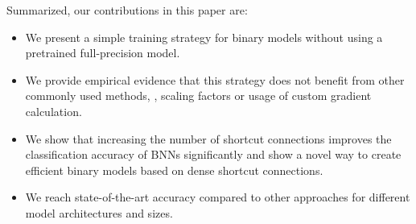 \documentclass[10pt,twocolumn,letterpaper]{article}
\begin{document}
Summarized, our contributions in this paper are:
\begin{itemize}
\itemsep0em
    \item We present a simple training strategy for binary models without using a pretrained full-precision model.
    \item We provide empirical evidence that this strategy does not benefit from other commonly used methods, \eg, scaling factors or usage of custom gradient calculation.
    \item We show that increasing the number of shortcut connections improves the classification accuracy of BNNs significantly and show a novel way to create efficient binary models based on dense shortcut connections.
    \item We reach state-of-the-art accuracy compared to other approaches for different model architectures and sizes.

\end{itemize}
\end{document}
